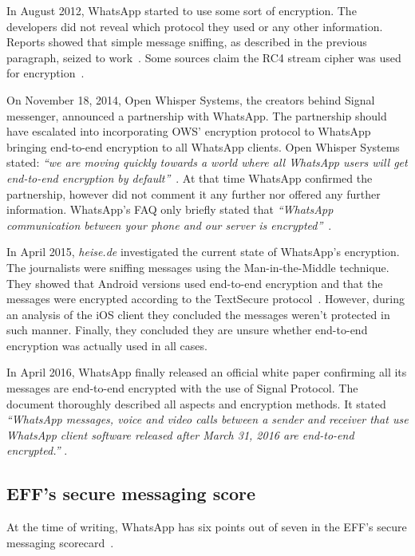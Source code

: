 \documentclass[thesis=M,english]{FITthesis}[2012/10/20]
\begin{document}
In August 2012, WhatsApp started to use some sort of encryption. The developers did not reveal which protocol they used or any other information. Reports showed that simple message sniffing, as described in the previous paragraph, seized to work~\cite{whatsapp-sniffernomore}. Some sources claim the  RC4 stream cipher was used for encryption~\cite{whatsapp-rc4,whatsapp-rc42}.

On November 18, 2014, Open Whisper Systems, the creators behind Signal messenger, announced a partnership with WhatsApp. The partnership should have escalated into incorporating OWS' encryption protocol to WhatsApp bringing end-to-end encryption to all WhatsApp clients. Open Whisper Systems stated: \emph{``we are moving quickly towards a world where all WhatsApp users will get end-to-end encryption by default''}~\cite{openwhisperwhatsapp}. At that time WhatsApp confirmed the partnership, however did not comment it any further nor offered any further information. WhatsApp's FAQ only briefly stated that \emph{``WhatsApp communication between your phone and our server is encrypted''}~\cite{whatsapp-faq}.

In April 2015, \emph{heise.de} investigated the current state of WhatsApp's encryption. The journalists were sniffing messages using the Man-in-the-Middle technique. They showed that Android versions used end-to-end encryption and that the messages were encrypted according to the TextSecure protocol~\cite{whatsapp-encstate}. However, during an analysis of the iOS client they concluded the messages weren't protected in such manner. Finally, they concluded they are unsure whether end-to-end encryption was actually used in all cases.

In April 2016, WhatsApp finally released an official white paper confirming all its messages are end-to-end encrypted with the use of Signal Protocol. The document thoroughly described all aspects and encryption methods. It stated \emph{``WhatsApp messages, voice and video calls between a sender and receiver that use WhatsApp client software released after March 31, 2016 are end-to-end encrypted.''} \cite{whatsapp-whitepaper}.


\subsection{EFF's secure messaging score}

At the time of writing, WhatsApp has six points out of seven in the EFF's secure messaging scorecard~\cite{eff-score}.
\end{document}

